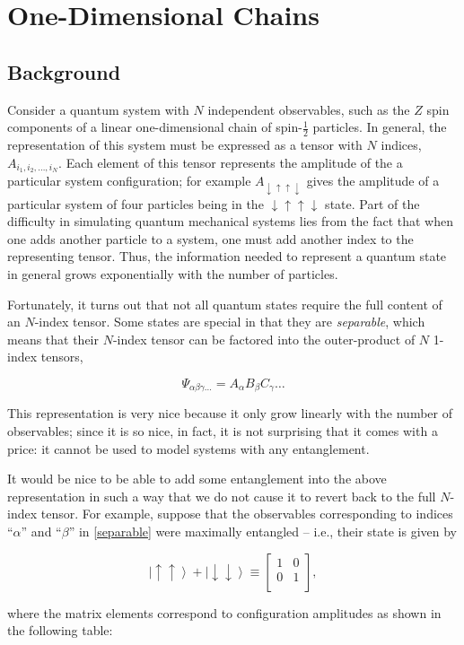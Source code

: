 \documentclass[12pt]{amsbook}
\theoremstyle{plain}
\theoremstyle{definition}
\theoremstyle{remark}
\newcommand{\bmat}[4]{
\begin{bmatrix}
#1 & #2\\
#3 & #4\\
\end{bmatrix}
}
\newcommand{\eqn}[2][]{\begin{equation}\label{#1}#2\end{equation}}
\newcommand{\half}{\frac{1}{2}}
\newcommand{\ket}[1]{\left|#1\right>}
\begin{document}
\section{One-Dimensional Chains}
\subsection{Background}

Consider a quantum system with $N$ independent observables, such as the $Z$ spin components of a linear one-dimensional chain of spin-$\half$ particles.  In general, the representation of this system must be expressed as a tensor with $N$ indices, $A_{i_1,i_2,\dots,i_N}$.  Each element of this tensor represents the amplitude of the a particular system configuration; for example $A_{\downarrow\uparrow\uparrow\downarrow}$ gives the amplitude of a particular system of four particles being in the $\downarrow\uparrow\uparrow\downarrow$ state.  Part of the difficulty in simulating quantum mechanical systems lies from the fact that when one adds another particle to a system, one must add another index to the representing tensor.  Thus, the information needed to represent a quantum state in general grows exponentially with the number of particles.

Fortunately, it turns out that not all quantum states require the full content of an $N$-index tensor.  Some states are special in that they are \textit{separable}, which means that their $N$-index tensor can be factored into the outer-product of $N$ 1-index tensors,

\eqn[separable]{\Psi_{\alpha\beta\gamma\dots} = A_\alpha B_\beta C_\gamma \dots}

This representation is very nice because it only grow linearly with the number of observables;  since it is so nice, in fact, it is not surprising that it comes with a price:  it cannot be used to model systems with any entanglement.

It would be nice to be able to add some entanglement into the above representation in such a way that we do not cause it to revert back to the full $N$-index tensor.  For example, suppose that the observables corresponding to indices ``$\alpha$'' and ``$\beta$'' in \eqref{separable} were maximally entangled -- i.e., their state is given by

$$\ket{\uparrow\uparrow}+\ket{\downarrow\downarrow} \equiv
\bmat{1}{0}{0}{1},
$$

\noindent where the matrix elements correspond to configuration amplitudes as shown in the following table:
\end{document}
